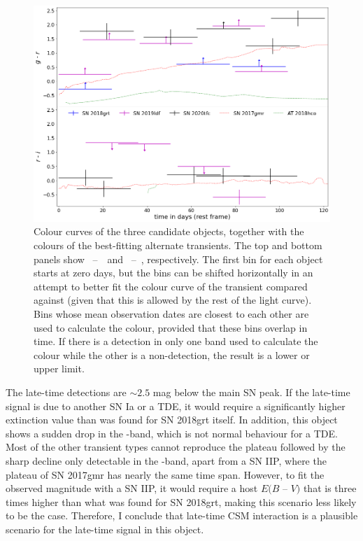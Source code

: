 \documentclass[a4paper,oneside,12pt, class=Latex/Classes/PhDthesisPSnPDF, crop=false]{standalone}
\begin{document}
\begin{figure}
 \centering
 \includegraphics[width=13cm]{../Images/chapter_3/candid_colours.png}
 \caption{Colour curves of the three candidate objects, together with the colours of the best-fitting alternate transients. The top and bottom panels show \ztfg~--~\ztfr\, and \ztfr~--~\ztfi, respectively. The first bin for each object starts at zero days, but the bins can be shifted horizontally in an attempt to better fit the colour curve of the transient compared against (given that this is allowed by the rest of the light curve). Bins whose mean observation dates are closest to each other are used to calculate the colour, provided that these bins overlap in time. If there is a detection in only one band used to calculate the colour while the other is a non-detection, the result is a lower or upper limit.}
 \label{candidate_colours}
\end{figure}

The late-time detections are $\sim2.5$ mag below the main SN peak. If the late-time signal is due to another SN Ia or a TDE, it would require a significantly higher extinction value than was found for SN 2018grt itself. In addition, this object shows a sudden drop in the \ztfr-band, which is not normal behaviour for a TDE. Most of the other transient types cannot reproduce the plateau followed by the sharp decline only detectable in the \ztfr-band, apart from a SN IIP, where the plateau of SN 2017gmr has nearly the same time span. However, to fit the observed magnitude with a SN IIP, it would require a host $ E(B$ -- $V)$ that is three times higher than what was found for SN 2018grt, making this scenario less likely to be the case. Therefore, I conclude that late-time CSM interaction is a plausible scenario for the late-time signal in this object.
\end{document}
